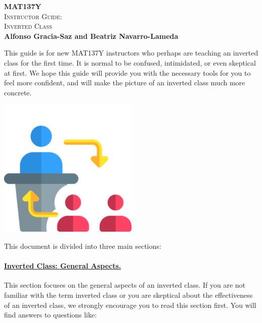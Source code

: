 \documentclass[11pt]{article}
\begin{document}
	\thispagestyle{empty}
	\phantom{.}
	\vspace{3cm}
	\begin{center}
		{ \fontsize{30}{28}\selectfont \textcolor{137cp3}{ {\bf MAT137Y }}\\[0.5\baselineskip]

		{\textcolor{137cp3}{ {\fontsize{20}{20} \scshape Instructor Guide:\\[0.5\baselineskip] Inverted Class}}} }\\[2\baselineskip]

		{\Large \bf \textcolor{137cp1}{Alfonso Gracia-Saz and Beatriz Navarro-Lameda} }
	\end{center}

	\vspace{0.5cm}

	\begin{center}
		\begin{minipage}{0.7\textwidth}
			This guide is for new MAT137Y instructors who perhaps are teaching an inverted
			class for the first time. It is normal to be confused, intimidated, or
			even skeptical at first. We hope this guide will provide you with the necessary
			tools for you to feel more confident, and will make the picture of an
			inverted class much more concrete.
		\end{minipage}

		\vspace{1cm}

		\includegraphics[width=0.5\textwidth]{flippedclass}
	\end{center}

	\newpage

	This document is divided into three main sections:

	\paragraph{\hyperref[sec:general]{Inverted Class: General Aspects.}}
	This section focuses on the general aspects of an inverted class. If you are not
	familiar with the term inverted class or you are skeptical about the effectiveness
	of an inverted class, we strongly encourage you to read this section first. You
	will find answers to questions like:
\end{document}
